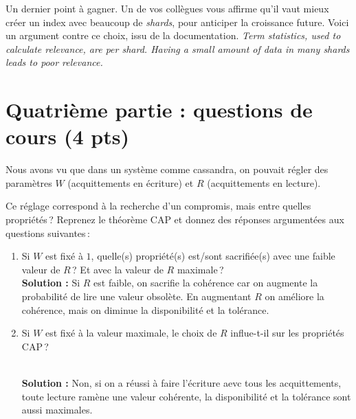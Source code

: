 \documentclass[11pt,a4paper]{article}
\newenvironment{solution}[0]{
~\\ \color{red} \textbf{Solution : }\color{black}}{%
}
\begin{document}
Un dernier point à gagner. Un de vos collègues vous affirme qu'il vaut mieux
créer un index avec beaucoup de \textit{shards}, pour anticiper la croissance future. Voici
un argument contre ce choix, issu de la documentation.
\textit{Term statistics, used to calculate relevance, are per shard. Having a small amount of 
data in many shards leads to poor relevance.} 

\section*{Quatrième partie : questions de cours (4 pts)}

Nous avons vu que dans un système comme cassandra, on pouvait régler des paramètres
$W$ (acquittements en écriture) et $R$ (acquittements en lecture). 

Ce réglage correspond à la recherche d'un compromis, mais entre quelles propriétés\,?  
Reprenez le théorème CAP et donnez des réponses argumentées aux questions suivantes\,:

\begin{enumerate}
  \item Si $W$ est fixé à $1$, quelle(s) propriété(s) est/sont sacrifiée(s) avec une faible valeur de $R$\,? 
    Et avec la valeur de $R$ maximale\,?
\begin{solution}
Si $R$ est faible, on sacrifie la cohérence car on augmente la probabilité de lire une valeur obsolète.
En augmentant $R$ on améliore la cohérence, mais on diminue la disponibilité et la tolérance.
\end{solution}

  \item Si $W$ est fixé à la valeur maximale, le choix de $R$ influe-t-il sur les propriétés CAP\,? 

\begin{solution}
Non, si on a réussi à faire l'écriture aevc tous les acquittements, toute lecture ramène une valeur cohérente,
la disponibilité et la tolérance sont aussi maximales.
\end{solution}
\end{enumerate}
\end{document}
